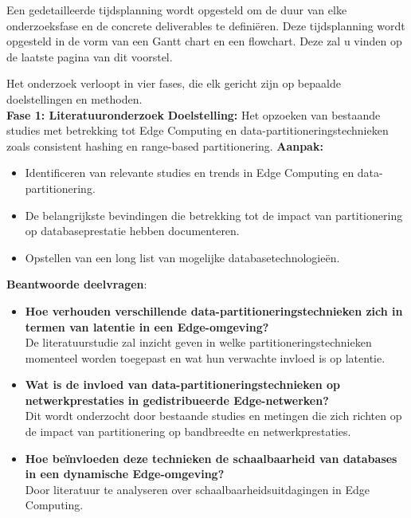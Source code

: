 Een gedetailleerde tijdsplanning wordt opgesteld om de duur van elke onderzoeksfase en de concrete deliverables te definiëren.
Deze tijdsplanning wordt opgesteld in de vorm van een Gantt chart en een flowchart. Deze zal u vinden op de laatste pagina van dit voorstel.

Het onderzoek verloopt in vier fases, die elk gericht zijn op bepaalde doelstellingen en methoden. \\

\textbf{Fase 1: Literatuuronderzoek}\newline\newline
    \textbf{Doelstelling:} Het opzoeken van bestaande studies met betrekking tot Edge Computing en data-partitioneringstechnieken zoals consistent hashing en range-based partitionering.\newline\newline
    \textbf{Aanpak:}
    \begin{itemize}
      \item Identificeren van relevante studies en trends in Edge Computing en data-partitionering.
      \item De belangrijkste bevindingen die betrekking tot de impact van partitionering op databaseprestatie hebben documenteren.
      \item Opstellen van een long list van mogelijke databasetechnologieën.
    \end{itemize}
    \textbf{Beantwoorde deelvragen}:
    \begin{itemize}
    \item \textbf{Hoe verhouden verschillende data-partitioneringstechnieken zich in termen van latentie in een Edge-omgeving?} \\
      De literatuurstudie zal inzicht geven in welke partitioneringstechnieken momenteel worden toegepast en wat hun verwachte invloed is op latentie.
    \item \textbf{Wat is de invloed van data-partitioneringstechnieken op netwerkprestaties in gedistribueerde Edge-netwerken?} \\
      Dit wordt onderzocht door bestaande studies en metingen die zich richten op de impact van partitionering op bandbreedte en netwerkprestaties.
    \item \textbf{Hoe beïnvloeden deze technieken de schaalbaarheid van databases in een dynamische Edge-omgeving?} \\
      Door literatuur te analyseren over schaalbaarheidsuitdagingen in Edge Computing.
    \end{itemize}
